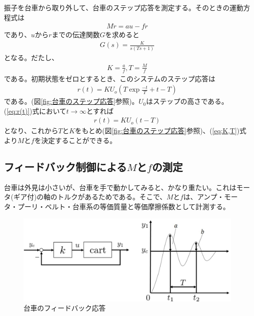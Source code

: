 \documentclass[a4j,11pt,twoside]{jbook}
\begin{document}
振子を台車から取り外して、台車のステップ応答を測定する。そのときの運動方程式は
\begin{eqnarray}
	M\ddot{r} = au - fr
\end{eqnarray}
であり、$u$から$r$までの伝達関数$G$を求めると
\begin{eqnarray}
	G(s) = \frac{K}{s(Ts+1)}
\end{eqnarray}
となる。だたし、
\begin{eqnarray}
K = \frac{a}{f},T = \frac{M}{f}
\label{eq:K,T}
\end{eqnarray}
である。初期状態をゼロとするとき、このシステムのステップ応答は
\begin{eqnarray}
r(t) = KU_o(T\exp{\frac{-t}{T}}+t-T)
\label{eq:r(t)}
\end{eqnarray}
である。(図\ref{fig:台車のステップ応答}参照)。$U_0$はステップの高さである。(\ref{eq:r(t)})式において$t→∞$とすれば
\begin{eqnarray}
r(t) = KU_o(t-T)
\end{eqnarray}
となり、これから$T$と$K$をもとめ(図\ref{fig:台車のステップ応答}参照)、(\ref{eq:K,T})式より$M$と$f$を決定することができる。

\subsection{フィードバック制御による$M$と$f$の測定}
台車は外見は小さいが、台車を手で動かしてみると、かなり重たい。これはモータ(ギア付)の軸のトルクがあるためである。そこで、$M$と$f$は、アンプ・モータ・プーリ・ベルト・台車系の等価質量と等価摩擦係数として計測する。

\begin{figure}[htbp]
	\begin{center}
		\includegraphics[width = 1.0 \linewidth]{feedback.eps}
		\caption{台車のフィードバック応答}
		\label{fig:台車のフィードバック応答}
	\end{center}
\end{figure}
\end{document}
